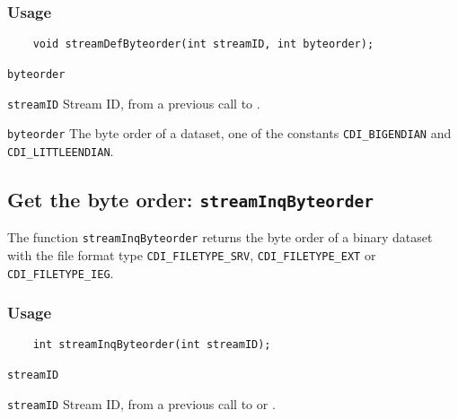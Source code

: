 \subsubsection*{Usage}

\begin{verbatim}
    void streamDefByteorder(int streamID, int byteorder);
\end{verbatim}

\hspace*{4mm}\begin{minipage}[]{15cm}
\begin{deflist}{\texttt{byteorder}\ }
\item[\texttt{streamID}]
Stream ID, from a previous call to {}.
\item[\texttt{byteorder}]
The byte order of a dataset, one of the {\CDI} constants {\texttt{CDI\_BIGENDIAN}} and
                     {\texttt{CDI\_LITTLEENDIAN}}.

\end{deflist}
\end{minipage}


\subsection{Get the byte order: \texttt{streamInqByteorder}}
\label{streamInqByteorder}

The function {\texttt{streamInqByteorder}} returns the byte order of a binary dataset
with the file format type {\texttt{CDI\_FILETYPE\_SRV}}, {\texttt{CDI\_FILETYPE\_EXT}} or {\texttt{CDI\_FILETYPE\_IEG}}.

\subsubsection*{Usage}

\begin{verbatim}
    int streamInqByteorder(int streamID);
\end{verbatim}

\hspace*{4mm}\begin{minipage}[]{15cm}
\begin{deflist}{\texttt{streamID}\ }
\item[\texttt{streamID}]
Stream ID, from a previous call to {} or {}.

\end{deflist}
\end{minipage}

